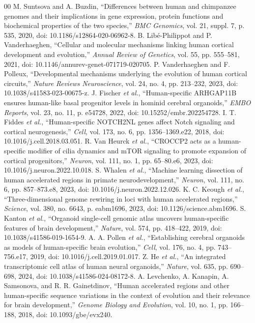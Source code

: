 \documentclass[conference]{IEEEtran}
\begin{document}
\begin{thebibliography}{00}
 M. Suntsova and A. Buzdin, ``Differences between human and chimpanzee genomes and their implications in gene expression, protein functions and biochemical properties of the two species,'' \emph{BMC Genomics}, vol. 21, suppl. 7, p. 535, 2020, doi: 10.1186/s12864-020-06962-8.
 B. Lib\'{e}-Philippot and P. Vanderhaeghen, ``Cellular and molecular mechanisms linking human cortical development and evolution,'' \emph{Annual Review of Genetics}, vol. 55, pp. 555--581, 2021, doi: 10.1146/annurev-genet-071719-020705.
 P. Vanderhaeghen and F. Polleux, ``Developmental mechanisms underlying the evolution of human cortical circuits,'' \emph{Nature Reviews Neuroscience}, vol. 24, no. 4, pp. 213--232, 2023, doi: 10.1038/s41583-023-00675-z.
 J. Fischer \emph{et al.}, ``Human-specific ARHGAP11B ensures human-like basal progenitor levels in hominid cerebral organoids,'' \emph{EMBO Reports}, vol. 23, no. 11, p. e54728, 2022, doi: 10.15252/embr.202254728.
 I. T. Fiddes \emph{et al.}, ``Human-specific NOTCH2NL genes affect Notch signaling and cortical neurogenesis,'' \emph{Cell}, vol. 173, no. 6, pp. 1356--1369.e22, 2018, doi: 10.1016/j.cell.2018.03.051.
 R. Van Heurck \emph{et al.}, ``CROCCP2 acts as a human-specific modifier of cilia dynamics and mTOR signaling to promote expansion of cortical progenitors,'' \emph{Neuron}, vol. 111, no. 1, pp. 65--80.e6, 2023, doi: 10.1016/j.neuron.2022.10.018.
 S. Whalen \emph{et al.}, ``Machine learning dissection of human accelerated regions in primate neurodevelopment,'' \emph{Neuron}, vol. 111, no. 6, pp. 857--873.e8, 2023, doi: 10.1016/j.neuron.2022.12.026.
 K. C. Keough \emph{et al.}, ``Three-dimensional genome rewiring in loci with human accelerated regions,'' \emph{Science}, vol. 380, no. 6643, p. eabm1696, 2023, doi: 10.1126/science.abm1696.
 S. Kanton \emph{et al.}, ``Organoid single-cell genomic atlas uncovers human-specific features of brain development,'' \emph{Nature}, vol. 574, pp. 418--422, 2019, doi: 10.1038/s41586-019-1654-9.
 A. A. Pollen \emph{et al.}, ``Establishing cerebral organoids as models of human-specific brain evolution,'' \emph{Cell}, vol. 176, no. 4, pp. 743--756.e17, 2019, doi: 10.1016/j.cell.2019.01.017.
 Z. He \emph{et al.}, ``An integrated transcriptomic cell atlas of human neural organoids,'' \emph{Nature}, vol. 635, pp. 690--698, 2024, doi: 10.1038/s41586-024-08172-8.
 A. Levchenko, A. Kanapin, A. Samsonova, and R. R. Gainetdinov, ``Human accelerated regions and other human-specific sequence variations in the context of evolution and their relevance for brain development,'' \emph{Genome Biology and Evolution}, vol. 10, no. 1, pp. 166--188, 2018, doi: 10.1093/gbe/evx240.
\end{thebibliography}
\end{document}
